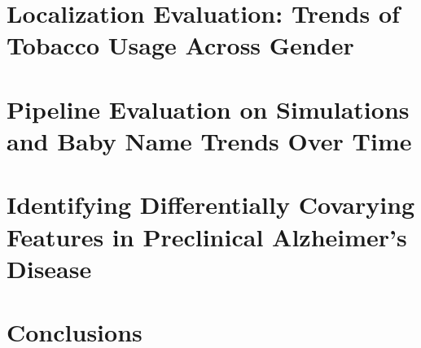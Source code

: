 \section{Localization Evaluation: Trends of Tobacco Usage Across Gender}
\label{sec:loceval}

\section{Pipeline Evaluation on Simulations and Baby Name Trends Over Time}
\label{sec:pipeval}

\section{Identifying Differentially Covarying Features in Preclinical Alzheimer's Disease}
\label{sec:wrap}

\section{Conclusions}

